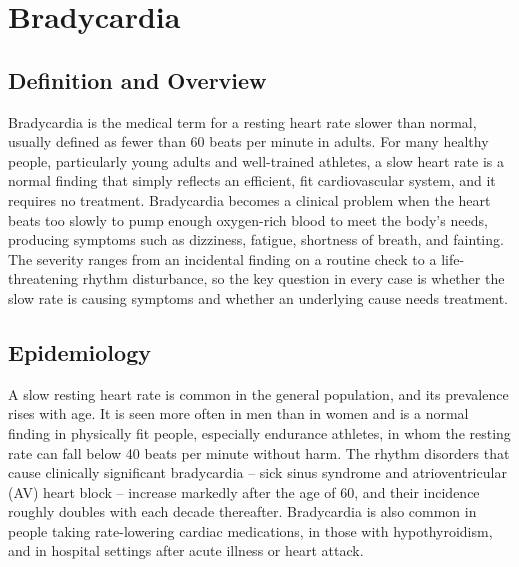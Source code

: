 \chapter{Bradycardia}

\section*{Definition and Overview}
Bradycardia is the medical term for a resting heart rate slower than normal, usually defined as fewer than 60 beats per minute in adults. For many healthy people, particularly young adults and well-trained athletes, a slow heart rate is a normal finding that simply reflects an efficient, fit cardiovascular system, and it requires no treatment. Bradycardia becomes a clinical problem when the heart beats too slowly to pump enough oxygen-rich blood to meet the body's needs, producing symptoms such as dizziness, fatigue, shortness of breath, and fainting. The severity ranges from an incidental finding on a routine check to a life-threatening rhythm disturbance, so the key question in every case is whether the slow rate is causing symptoms and whether an underlying cause needs treatment.

\section*{Epidemiology}
A slow resting heart rate is common in the general population, and its prevalence rises with age. It is seen more often in men than in women and is a normal finding in physically fit people, especially endurance athletes, in whom the resting rate can fall below 40 beats per minute without harm. The rhythm disorders that cause clinically significant bradycardia -- sick sinus syndrome and atrioventricular (AV) heart block -- increase markedly after the age of 60, and their incidence roughly doubles with each decade thereafter. Bradycardia is also common in people taking rate-lowering cardiac medications, in those with hypothyroidism, and in hospital settings after acute illness or heart attack.


